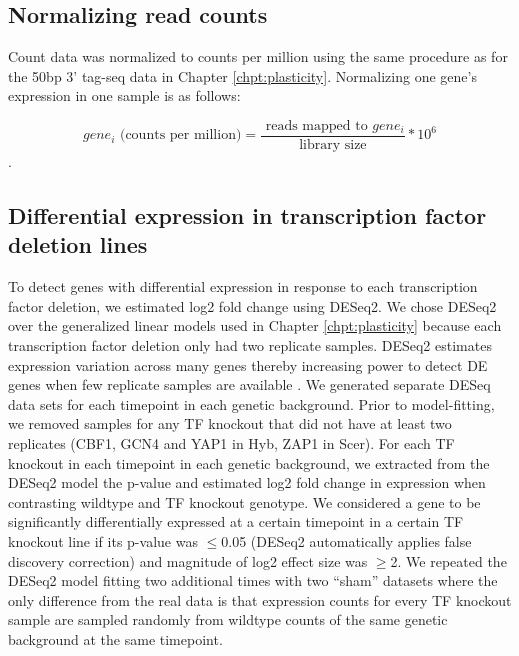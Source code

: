\subsection{Normalizing read counts}

Count data was normalized to counts per million using the same procedure as for the 50bp 3' tag-seq data in Chapter \ref{chpt:plasticity}. Normalizing one gene's expression in one sample is as follows:

$$ gene_i \text{ (counts per million)} = \frac{\text{ reads mapped to } gene_i}{\text{library size}}*10^6 $$.

\subsection{Differential expression in transcription factor deletion lines}

To detect genes with differential expression in response to each transcription factor deletion, we estimated log2 fold change using DESeq2. We chose DESeq2 over the generalized linear models used in Chapter \ref{chpt:plasticity} because each transcription factor deletion only had two replicate samples. DESeq2 estimates expression variation across many genes thereby increasing power to detect DE genes when few replicate samples are available \cite{Love2014}. We generated separate DESeq data sets for each timepoint in each genetic background. Prior to model-fitting, we removed samples for any TF knockout that did not have at least two replicates (CBF1, GCN4 and YAP1 in Hyb, ZAP1 in Scer). For each TF knockout in each timepoint in each genetic background, we extracted from the DESeq2 model the p-value and estimated log2 fold change in expression when contrasting wildtype and TF knockout genotype.  We considered a gene to be significantly differentially expressed at a certain timepoint in a certain TF knockout line if its p-value was $\leq$0.05 (DESeq2 automatically applies false discovery correction) and magnitude of log2 effect size was $\geq$2. We repeated the DESeq2 model fitting two additional times with two ``sham'' datasets where the only difference from the real data is that expression counts for every TF knockout sample are sampled randomly from wildtype counts of the same genetic background at the same timepoint.
